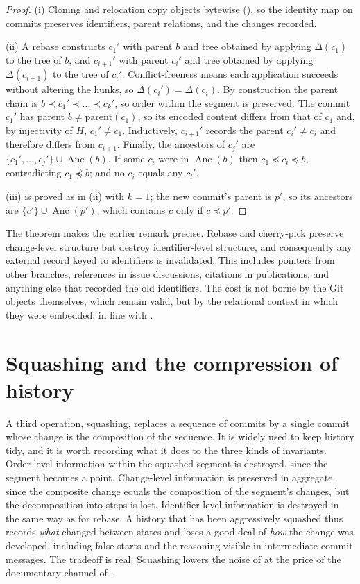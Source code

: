 \documentclass[11pt,twoside,openright]{book}
\theoremstyle{plain}
\theoremstyle{definition}
\theoremstyle{remark}
\newcommand{\anc}{\preceq}
\DeclareMathOperator{\Anc}{Anc}
\begin{document}
\begin{proof}
(i) Cloning and relocation copy objects bytewise (), so the identity map on commits preserves identifiers, parent relations, and the changes recorded.

(ii) A rebase constructs $c_1'$ with parent $b$ and tree obtained by applying $\Delta(c_1)$ to the tree of $b$, and $c_{i+1}'$ with parent $c_i'$ and tree obtained by applying $\Delta(c_{i+1})$ to the tree of $c_i'$. Conflict-freeness means each application succeeds without altering the hunks, so $\Delta(c_i')=\Delta(c_i)$. By construction the parent chain is $b\prec c_1'\prec\dots\prec c_k'$, so order within the segment is preserved. The commit $c_1'$ has parent $b\ne\mathrm{parent}(c_1)$, so its encoded content differs from that of $c_1$ and, by injectivity of $H$, $c_1'\ne c_1$. Inductively, $c_{i+1}'$ records the parent $c_i'\neq c_i$ and therefore differs from $c_{i+1}$. Finally, the ancestors of $c_j'$ are $\{c_1',\dots,c_j'\}\cup\Anc(b)$. If some $c_i$ were in $\Anc(b)$ then $c_1\anc c_i\anc b$, contradicting $c_1\not\anc b$; and no $c_i$ equals any $c_l'$.

(iii) is proved as in (ii) with $k=1$; the new commit's parent is $p'$, so its ancestors are $\{c'\}\cup\Anc(p')$, which contains $c$ only if $c\anc p'$.
\end{proof}

The theorem makes the earlier remark precise. Rebase and cherry-pick preserve change-level structure but destroy identifier-level structure, and consequently any external record keyed to identifiers is invalidated. This includes pointers from other branches, references in issue discussions, citations in publications, and anything else that recorded the old identifiers. The cost is not borne by the Git objects themselves, which remain valid, but by the relational context in which they were embedded, in line with .

\section{Squashing and the compression of history}

A third operation, squashing, replaces a sequence of commits by a single commit whose change is the composition of the sequence. It is widely used to keep history tidy, and it is worth recording what it does to the three kinds of invariants. Order-level information within the squashed segment is destroyed, since the segment becomes a point. Change-level information is preserved in aggregate, since the composite change equals the composition of the segment's changes, but the decomposition into steps is lost. Identifier-level information is destroyed in the same way as for rebase. A history that has been aggressively squashed thus records \emph{what} changed between states and loses a good deal of \emph{how} the change was developed, including false starts and the reasoning visible in intermediate commit messages. The tradeoff is real. Squashing lowers the noise of  at the price of the documentary channel of .
\end{document}
